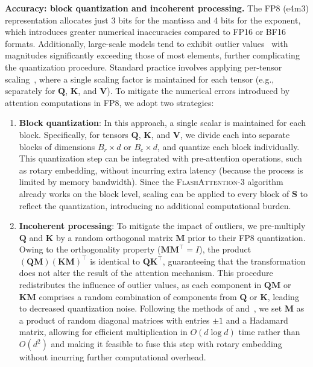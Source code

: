 \begin{enumerate}
\textbf{Accuracy: block quantization and incoherent processing.} The FP8 (e4m3) representation allocates just 3 bits for the mantissa and 4 bits for the exponent, which introduces greater numerical inaccuracies compared to FP16 or BF16 formats. Additionally, large-scale models tend to exhibit outlier values~\citep{dettmers2208llm, sun2024massive} with magnitudes significantly exceeding those of most elements, further complicating the quantization procedure. Standard practice involves applying per-tensor scaling~\citep{micikevicius2022fp8}, where a single scaling factor is maintained for each tensor (e.g., separately for $\mathbf{Q}$, $\mathbf{K}$, and $\mathbf{V}$). To mitigate the numerical errors introduced by attention computations in FP8, we adopt two strategies:

\begin{enumerate}

\item \textbf{Block quantization}: In this approach, a single scalar is maintained for each block. Specifically, for tensors $\mathbf{Q}$, $\mathbf{K}$, and $\mathbf{V}$, we divide each into separate blocks of dimensions $B_r \times d$ or $B_c \times d$, and quantize each block individually. This quantization step can be integrated with pre-attention operations, such as rotary embedding, without incurring extra latency (because the process is limited by memory bandwidth). Since the \textsc{FlashAttention-3} algorithm already works on the block level, scaling can be applied to every block of $\mathbf{S}$ to reflect the quantization, introducing no additional computational burden.

\item \textbf{Incoherent processing}: To mitigate the impact of outliers, we pre-multiply $\mathbf{Q}$ and $\mathbf{K}$ by a random orthogonal matrix $\mathbf{M}$ prior to their FP8 quantization. Owing to the orthogonality property ($\mathbf{M} \mathbf{M}^\top = I$), the product $(\mathbf{Q} \mathbf{M}) (\mathbf{K} \mathbf{M})^\top$ is identical to $\mathbf{Q} \mathbf{K}^\top$, guaranteeing that the transformation does not alter the result of the attention mechanism. This procedure redistributes the influence of outlier values, as each component in $\mathbf{Q} \mathbf{M}$ or $\mathbf{K} \mathbf{M}$ comprises a random combination of components from $\mathbf{Q}$ or $\mathbf{K}$, leading to decreased quantization noise. Following the methods of \citet{chee2024quip} and~\citet{tseng2024quip}, we set $\mathbf{M}$ as a product of random diagonal matrices with entries $\pm 1$ and a Hadamard matrix, allowing for efficient multiplication in $O(d \log d)$ time rather than $O(d^2)$ and making it feasible to fuse this step with rotary embedding without incurring further computational overhead.
\end{enumerate}


\end{enumerate}
